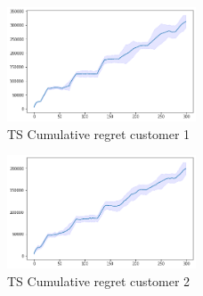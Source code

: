 \begin{multicols}{2}
    \begin{figure}[H]
        \begin{center}
        \includegraphics[width=0.5\textwidth]{img/ts7_1cum_reg.png}
        \caption{TS Cumulative regret customer 1}
        \label{fig:Cum_reg71}
        \end{center}
    \end{figure}
    \columnbreak
    \begin{figure}[H]
        \begin{center}
        \includegraphics[width=0.5\textwidth]{img/ts7_2cum_reg.png}
        \caption{TS Cumulative regret customer 2}
        \label{fig:Cum_reg72}
        \end{center}
    \end{figure}
\end{multicols}
